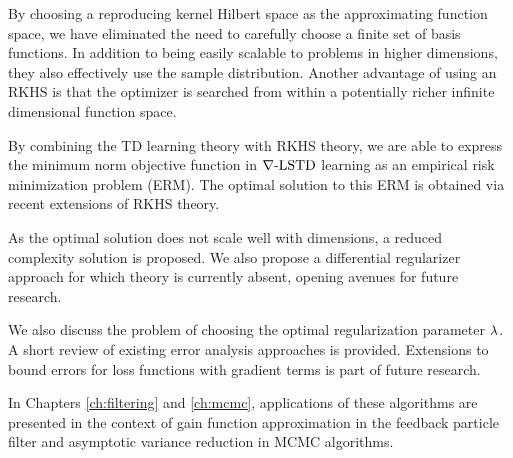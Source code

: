 \begin{romannum}
\item By choosing a reproducing kernel Hilbert space as the approximating function space, we have eliminated the need to carefully choose a finite set of basis functions. In addition to being easily scalable to problems in higher dimensions, they also effectively use the sample distribution. Another advantage of using an RKHS is that the optimizer is searched from within a potentially richer infinite dimensional function space.  
\item By combining the TD learning theory with RKHS theory, we are able to express the minimum norm objective function in $\nabla\text{-LSTD}$ learning as an empirical risk minimization problem (ERM). The optimal solution to this ERM is obtained via recent extensions of RKHS theory. 
\item As the optimal solution does not scale well with dimensions, a reduced complexity solution is proposed. We also propose a differential regularizer approach for which theory is currently absent, opening avenues for future research.
\item We also discuss the problem of choosing the optimal regularization parameter $\lambda$. A short review of existing error analysis approaches is provided. Extensions to bound errors for loss functions with gradient terms is part of future research.
\item In Chapters \ref{ch:filtering} and \ref{ch:mcmc}, applications of these algorithms are presented in the context of gain function approximation in the feedback particle filter and asymptotic variance reduction in MCMC algorithms.  
\end{romannum}


